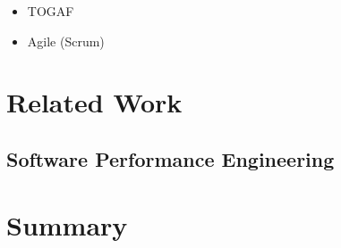 \begin{itemize}
	\item TOGAF
	\item Agile (Scrum)
\end{itemize}


\section{Related Work}

\subsection{Software Performance Engineering} %
\label{sub:software_performance_engineering}


\section{Summary} 
